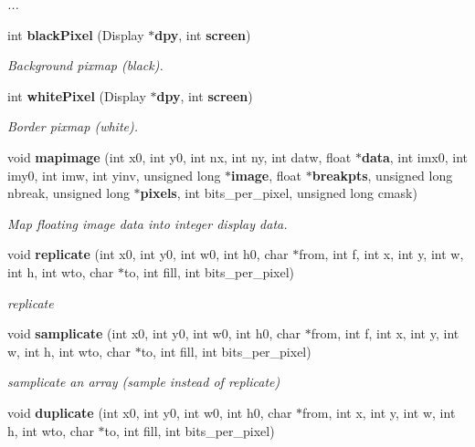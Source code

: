 \begin{CompactItemize}
\begin{CompactList}\small\item\em ... \item\end{CompactList}\item 
int {\bf black\-Pixel} (Display $\ast${\bf dpy}, int {\bf screen})
\begin{CompactList}\small\item\em Background pixmap (black). \item\end{CompactList}\item 
int {\bf white\-Pixel} (Display $\ast${\bf dpy}, int {\bf screen})
\begin{CompactList}\small\item\em Border pixmap (white). \item\end{CompactList}\item 
void {\bf mapimage} (int x0, int y0, int nx, int ny, int datw, float $\ast${\bf data}, int imx0, int imy0, int imw, int yinv, unsigned long $\ast${\bf image}, float $\ast${\bf breakpts}, unsigned long nbreak, unsigned long $\ast${\bf pixels}, int bits\_\-per\_\-pixel, unsigned long cmask)
\begin{CompactList}\small\item\em Map floating image data into integer display data. \item\end{CompactList}\item 
void {\bf replicate} (int x0, int y0, int w0, int h0, char $\ast$from, int f, int x, int y, int w, int h, int wto, char $\ast$to, int fill, int bits\_\-per\_\-pixel)
\begin{CompactList}\small\item\em replicate \item\end{CompactList}\item 
void {\bf samplicate} (int x0, int y0, int w0, int h0, char $\ast$from, int f, int x, int y, int w, int h, int wto, char $\ast$to, int fill, int bits\_\-per\_\-pixel)
\begin{CompactList}\small\item\em samplicate an array (sample instead of replicate) \item\end{CompactList}\item 
void {\bf duplicate} (int x0, int y0, int w0, int h0, char $\ast$from, int x, int y, int w, int h, int wto, char $\ast$to, int fill, int bits\_\-per\_\-pixel)

\end{CompactItemize}
